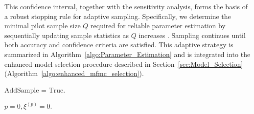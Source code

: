 This confidence interval, together with the sensitivity analysis, forms the basis of a robust stopping rule for adaptive sampling. Specifically, we determine the minimal pilot sample size $Q$ required for reliable parameter estimation by sequentially updating sample statistics as $Q$ increases \cite{La:2001,Wa:1947}. Sampling continues until both accuracy and confidence criteria are satisfied. This adaptive strategy is summarized in Algorithm~\ref{algo:Parameter_Estimation} and is integrated into the enhanced model selection procedure described in Section~\ref{sec:Model_Selection} (Algorithm~\ref{algo:enhanced_mfmc_selection}).
%
\begin{algorithm}[!ht]
\DontPrintSemicolon


    
    $\text{AddSample = True}.$

    $p=0, \xi^{(p)} = 0.$
    
\end{algorithm}
